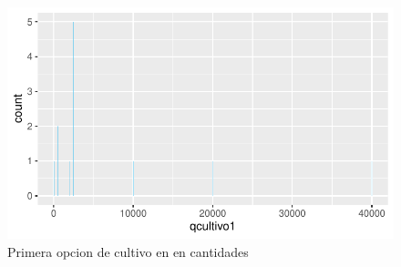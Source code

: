 \documentclass[12pt]{article}\usepackage[]{graphicx}\usepackage[]{xcolor}
\makeatletter
\def\maxwidth{ %
  \ifdim\Gin@nat@width>\linewidth
    \linewidth
  \else
    \Gin@nat@width
  \fi
}
\newenvironment{knitrout}{}{} %
\makeatother
\begin{document}
	\begin{figure}[H]
	\centering
\begin{knitrout}
\color{fgcolor}
\includegraphics[width=\maxwidth]{figure/eight-1} 
\end{knitrout}
	\caption{Primera opcion de cultivo en \comunidad \- en cantidades}
	\end{figure}
	
\end{document}
